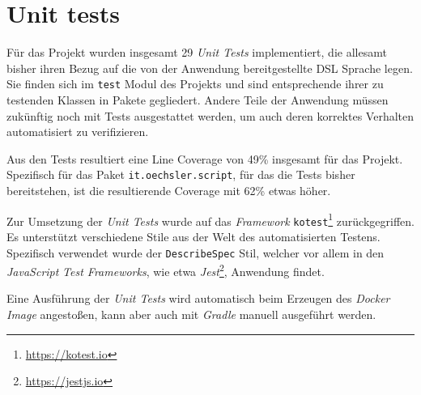 \section{Unit tests}
\label{sec:unit_tests}

Für das Projekt wurden insgesamt 29 \emph{Unit Tests} implementiert, die allesamt bisher ihren Bezug auf die von der Anwendung bereitgestellte DSL Sprache legen.
Sie finden sich im \texttt{test} Modul des Projekts und sind entsprechende ihrer zu testenden Klassen in Pakete gegliedert.
Andere Teile der Anwendung müssen zukünftig noch mit Tests ausgestattet werden, um auch deren korrektes Verhalten automatisiert zu verifizieren.

Aus den Tests resultiert eine Line Coverage von 49\% insgesamt für das Projekt.
Spezifisch für das Paket \texttt{it.oechsler.script}, für das die Tests bisher bereitstehen, ist die resultierende Coverage mit 62\% etwas höher.

Zur Umsetzung der \emph{Unit Tests} wurde auf das \emph{Framework} \texttt{kotest}\footnote{\url{https://kotest.io}} zurückgegriffen.
Es unterstützt verschiedene Stile aus der Welt des automatisierten Testens.
Spezifisch verwendet wurde der \texttt{DescribeSpec} Stil, welcher vor allem in den \emph{JavaScript} \emph{Test Frameworks}, wie etwa \emph{Jest}\footnote{\url{https://jestjs.io}}, Anwendung findet.

Eine Ausführung der \emph{Unit Tests} wird automatisch beim Erzeugen des \emph{Docker} \emph{Image} angestoßen, kann aber auch mit \emph{Gradle} manuell ausgeführt werden.

